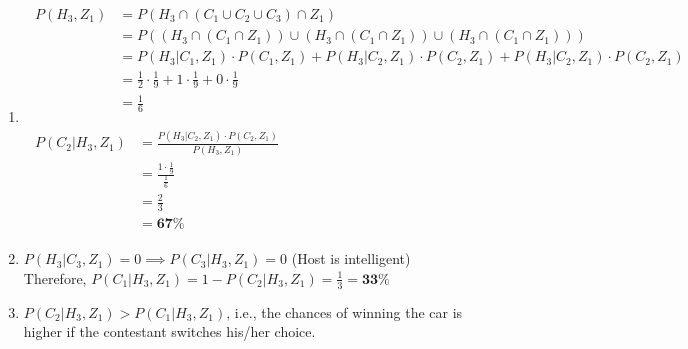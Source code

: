 \documentclass[11pt]{article}
\begin{document}
\begin{enumerate}[label=(\alph*)]
    \item
          \begin{align*}
              \begin{split}
                  P(H_3, Z_1) &= P(H_3 \cap (C_1 \cup C_2 \cup C_3) \cap Z_1) \\
                  &= P((H_3 \cap (C_1 \cap Z_1)) \cup (H_3 \cap (C_1 \cap Z_1)) \cup (H_3 \cap (C_1 \cap Z_1))) \\
                  &= P(H_3|C_1,Z_1) \cdot P(C_1,Z_1) + P(H_3|C_2,Z_1) \cdot P(C_2,Z_1) + P(H_3|C_2,Z_1) \cdot P(C_2,Z_1) \\
                  &= \frac{1}{2} \cdot \frac{1}{9} + 1 \cdot \frac{1}{9} + 0 \cdot \frac{1}{9} \\
                  &= \frac{1}{6}
              \end{split} \\\\
              \begin{split}
                  P(C_2|H_3, Z_1) &= \frac{P(H_3|C_2, Z_1) \cdot P(C_2, Z_1)}{P(H_3, Z_1)} \\
                  &= \frac{1 \cdot \frac{1}{9}}{\frac{1}{6}} \\
                  &= \frac{2}{3} \\
                  &= \mathbf{67\%}
              \end{split}
          \end{align*}

    \item
          $P(H_3|C_3,Z_1) = 0 \implies P(C_3|H_3, Z_1)=0$ \hspace{1em} (Host is intelligent)\\
          Therefore, $P(C_1|H_3, Z_1) = 1 - P(C_2|H_3, Z_1) = \frac{1}{3} = \mathbf{33\%}$

    \item
          $P(C_2|H_3, Z_1) > P(C_1|H_3, Z_1)$, i.e., the chances of winning the car is higher if the contestant switches his/her choice.


\end{enumerate}
\end{document}
